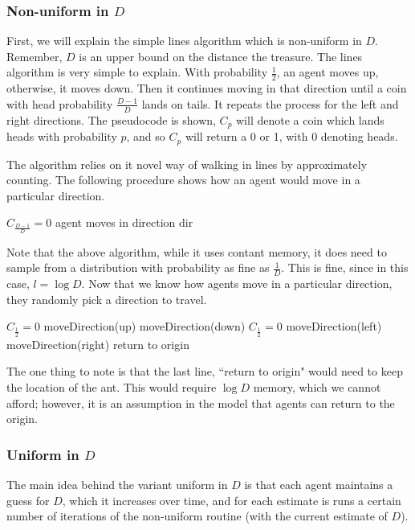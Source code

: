 \documentclass[runningheads,a4paper]{llncs}
\begin{document}
\subsubsection{Non-uniform in $D$} First, we will explain the simple lines algorithm which is non-uniform in $D$. Remember, $D$ is an upper bound on the distance the treasure. The lines algorithm is very simple to explain. With probability $\frac{1}{2}$, an agent moves up, otherwise, it moves down. Then it continues moving in that direction until a coin with head probability $\frac{D-1}{D}$ lands on tails. It repeats the process for the left and right directions. The pseudocode is shown, $C_p$ will denote a coin which lands heads with probability $p$, and so $C_p$ will return a 0 or 1, with 0 denoting heads.

The algorithm relies on it novel way of walking in lines by approximately counting. The following procedure shows how an agent would move in a particular direction. 

\begin{codebox}
\li \While $C_{\frac{D-1}{D}} = 0$ \Then
\li agent moves in direction dir \End
\end{codebox}

Note that the above algorithm, while it uses contant memory, it does need to sample from a distribution with probability as fine as $\frac{1}{D}$. This is fine, since in this case, $l = \log D$. 
Now that we know how agents move in a particular direction, they randomly pick a direction to travel.

\begin{codebox}
\li \If $C_{\frac{1}{2}} = 0$ \Then
\li moveDirection(up)
\li \Else moveDirection(down) \End
\li \If $C_{\frac{1}{2}} = 0$ \Then
\li moveDirection(left)
\li \Else moveDirection(right) \End \End
\li return to origin
\end{codebox}

The one thing to note is that the last line, ``return to origin" would need to keep the location of the ant. This would require $\log D$ memory, which we cannot afford; however, it is an assumption in the model that agents can return to the origin.

\subsubsection{Uniform in $D$}

The main idea behind the variant uniform in $D$ is that each agent maintains a guess for $D$, which it increases over time, and for each estimate is runs a certain number of iterations of the non-uniform routine (with the current estimate of $D$).
\end{document}
